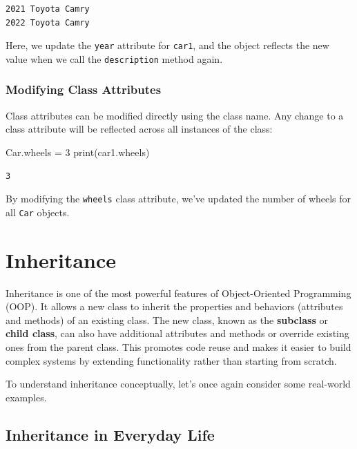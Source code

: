 \documentclass[
  letterpaper,
  DIV=11,
  numbers=noendperiod]{scrreprt}
\newenvironment{Shaded}{\begin{snugshade}}{\end{snugshade}}
\newcommand{\BuiltInTok}[1]{\textcolor[rgb]{0.00,0.23,0.31}{#1}}
\newcommand{\DecValTok}[1]{\textcolor[rgb]{0.68,0.00,0.00}{#1}}
\newcommand{\NormalTok}[1]{\textcolor[rgb]{0.00,0.23,0.31}{#1}}
\newcommand{\OperatorTok}[1]{\textcolor[rgb]{0.37,0.37,0.37}{#1}}
\begin{document}
\begin{verbatim}
2021 Toyota Camry
2022 Toyota Camry
\end{verbatim}

Here, we update the \texttt{year} attribute for \texttt{car1}, and the
object reflects the new value when we call the \texttt{description}
method again.

\hypertarget{modifying-class-attributes}{%
\subsubsection{Modifying Class
Attributes}\label{modifying-class-attributes}}

Class attributes can be modified directly using the class name. Any
change to a class attribute will be reflected across all instances of
the class:

\begin{Shaded}
\begin{Highlighting}[]
\NormalTok{Car.wheels }\OperatorTok{=} \DecValTok{3}
\BuiltInTok{print}\NormalTok{(car1.wheels)}
\end{Highlighting}
\end{Shaded}

\begin{verbatim}
3
\end{verbatim}

By modifying the \texttt{wheels} class attribute, we've updated the
number of wheels for all \texttt{Car} objects.

\hypertarget{inheritance}{%
\section{Inheritance}\label{inheritance}}

Inheritance is one of the most powerful features of Object-Oriented
Programming (OOP). It allows a new class to inherit the properties and
behaviors (attributes and methods) of an existing class. The new class,
known as the \textbf{subclass} or \textbf{child class}, can also have
additional attributes and methods or override existing ones from the
parent class. This promotes code reuse and makes it easier to build
complex systems by extending functionality rather than starting from
scratch.

To understand inheritance conceptually, let's once again consider some
real-world examples.

\hypertarget{inheritance-in-everyday-life}{%
\subsection{Inheritance in Everyday
Life}\label{inheritance-in-everyday-life}}
\end{document}
